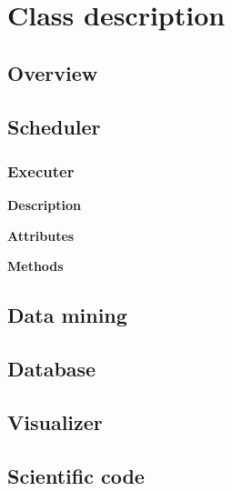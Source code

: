 \section{Class description}

	\subsection{Overview}
	
	\subsection{Scheduler}
	
		\subsubsection{Executer}
			
			\textbf{Description}
			
			\textbf{Attributes}
			
			\textbf{Methods}
			
	
	\subsection{Data mining}
	
	\subsection{Database}
	
	\subsection{Visualizer}
	
	\subsection {Scientific code}

